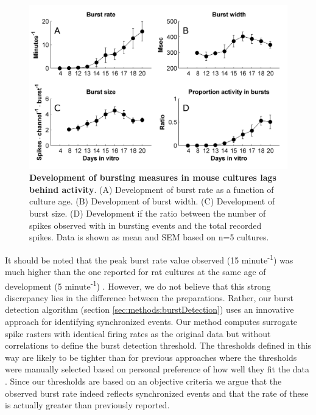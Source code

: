       \begin{figure}[!htb]
            \centering
            \includegraphics[width=15cm]{chapter3/figures/burstMeasures/burstMeasures.jpg}

            \caption[Averaged statistics of development of bursting measures in mouse cultures]{\textbf{Development of bursting measures in mouse cultures lags behind activity}. (A) Development of burst rate as a function of culture age. (B) Development of burst width. (C) Development of burst size. (D) Development if the ratio between the number of spikes observed with in bursting events and the total recorded spikes. Data is shown as mean and SEM based on n=5 cultures.}
            \label{fig:activity:burstMeasures}
        \end{figure}

        It should be noted that the peak burst rate value observed (15 minute\textsuperscript{-1}) was much higher than the one reported for rat cultures at the same age of development (5 minute\textsuperscript{-1}) \cite{chiappalone2006dissociated}. However, we do not believe that this strong discrepancy lies in the difference between the preparations. Rather, our burst detection algorithm (section \ref{sec:methods:burstDetection}) uses an innovative approach for identifying synchronized events. Our method computes surrogate spike rasters with identical firing rates as the original data but without correlations to define the burst detection threshold. The thresholds defined in this way are likely to be tighter than for previous approaches where the thresholds were manually selected based on personal preference of how well they fit the data \cite{wagenaar2006extremely,chiappalone2005burst}. Since our thresholds are based on an objective criteria we argue that the observed burst rate indeed reflects synchronized events and that the rate of these is actually greater than previously reported.


